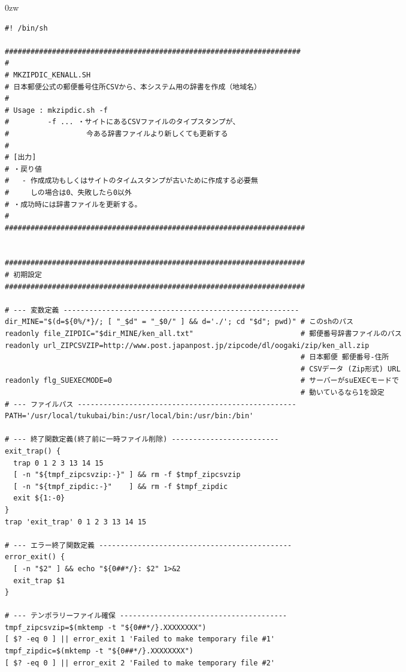 \begin{indentation}{-9mm}{0zw}
\begin{verbatim}
#! /bin/sh

#####################################################################
#
# MKZIPDIC_KENALL.SH
# 日本郵便公式の郵便番号住所CSVから、本システム用の辞書を作成（地域名）
#
# Usage : mkzipdic.sh -f
#         -f ... ・サイトにあるCSVファイルのタイプスタンプが、
#                  今ある辞書ファイルより新しくても更新する
#
# [出力]
# ・戻り値
#   - 作成成功もしくはサイトのタイムスタンプが古いために作成する必要無
#     しの場合は0、失敗したら0以外
# ・成功時には辞書ファイルを更新する。
#
######################################################################


######################################################################
# 初期設定
######################################################################

# --- 変数定義 -------------------------------------------------------
dir_MINE="$(d=${0%/*}/; [ "_$d" = "_$0/" ] && d='./'; cd "$d"; pwd)" # このshのパス
readonly file_ZIPDIC="$dir_MINE/ken_all.txt"                         # 郵便番号辞書ファイルのパス
readonly url_ZIPCSVZIP=http://www.post.japanpost.jp/zipcode/dl/oogaki/zip/ken_all.zip
                                                                     # 日本郵便 郵便番号-住所
                                                                     # CSVデータ (Zip形式) URL
readonly flg_SUEXECMODE=0                                            # サーバーがsuEXECモードで
                                                                     # 動いているなら1を設定
# --- ファイルパス ---------------------------------------------------
PATH='/usr/local/tukubai/bin:/usr/local/bin:/usr/bin:/bin'

# --- 終了関数定義(終了前に一時ファイル削除) -------------------------
exit_trap() {
  trap 0 1 2 3 13 14 15
  [ -n "${tmpf_zipcsvzip:-}" ] && rm -f $tmpf_zipcsvzip
  [ -n "${tmpf_zipdic:-}"    ] && rm -f $tmpf_zipdic
  exit ${1:-0}
}
trap 'exit_trap' 0 1 2 3 13 14 15

# --- エラー終了関数定義 ---------------------------------------------
error_exit() {
  [ -n "$2" ] && echo "${0##*/}: $2" 1>&2
  exit_trap $1
}

# --- テンポラリーファイル確保 ---------------------------------------
tmpf_zipcsvzip=$(mktemp -t "${0##*/}.XXXXXXXX")
[ $? -eq 0 ] || error_exit 1 'Failed to make temporary file #1'
tmpf_zipdic=$(mktemp -t "${0##*/}.XXXXXXXX")
[ $? -eq 0 ] || error_exit 2 'Failed to make temporary file #2'




\end{verbatim}
\end{indentation}
